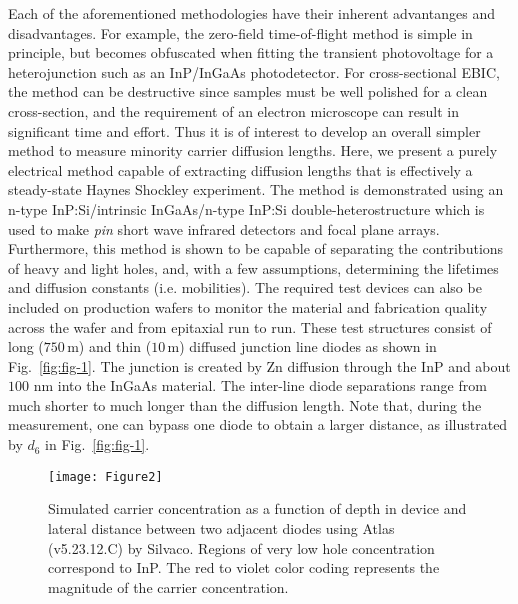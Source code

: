 \documentclass[aip,amsmath,amssymb,reprint]{revtex4-1}
\begin{document}
Each of the aforementioned methodologies have their inherent advantanges and disadvantages.
 For example, the zero-field time-of-flight method is simple in principle, but becomes obfuscated when fitting the transient photovoltage for a heterojunction such as an InP/InGaAs photodetector.
 For cross-sectional EBIC, the method can be destructive since samples must be well polished for a clean cross-section, and the requirement of an electron microscope can result in significant time and effort.
 Thus it is of interest to develop an overall simpler method to measure minority carrier diffusion lengths. Here, we present a purely electrical method capable of extracting diffusion lengths that is effectively a steady-state Haynes Shockley experiment.\cite{Haynes, Shockley}
 The method is demonstrated using an n-type InP:Si/intrinsic InGaAs/n-type InP:Si double-heterostructure which is used to make \textit{pin} short wave infrared detectors and focal plane arrays.\cite{Walkerb}
 Furthermore, this method is shown to be capable of separating the contributions of heavy and light holes, and, with a few assumptions, determining the lifetimes and diffusion constants (i.e. mobilities).
 The required test devices can also be included on production wafers to monitor the material and fabrication quality across the wafer and from epitaxial run to run.
 These test structures consist of long ($750\,$\textmu m) and thin ($10\,$\textmu m) diffused junction line diodes as shown in Fig.~\ref{fig:fig-1}.
 The junction is created by Zn diffusion through the InP and about $100$ nm into the InGaAs material.
 The inter-line diode separations range from much shorter to much longer than the diffusion length.
 Note that, during the measurement, one can bypass one diode to obtain a larger distance, as illustrated by $d_6$ in Fig.~\ref{fig:fig-1}.


   \begin{figure} [t]
   \begin{center}
   \texttt{[image: Figure2]}
   \end{center}
   \caption[example]
   { \label{fig:fig-2}
Simulated carrier concentration as a function of depth in device and lateral distance between two adjacent diodes using Atlas (v5.23.12.C) by Silvaco. Regions of very low hole concentration correspond to InP. The red to violet color coding represents the magnitude of the carrier concentration.}
   \end{figure}
\end{document}
